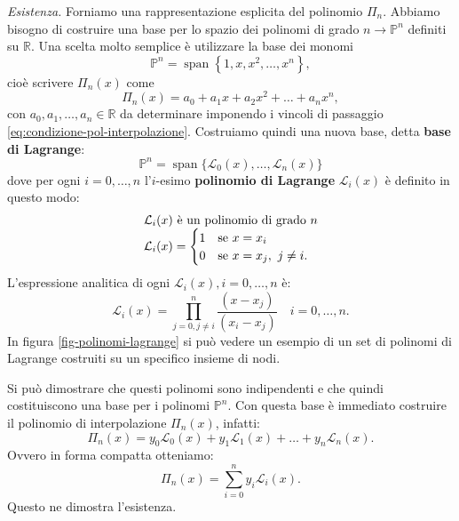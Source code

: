 \textit{Esistenza.} Forniamo una rappresentazione esplicita del polinomio $\Pi _{n}$. Abbiamo bisogno di costruire una base per lo spazio dei polinomi di grado $n\rightarrow \mathbb{P}^{n}$ definiti su $\mathbb{R}$. Una scelta molto semplice è utilizzare la base dei monomi
\begin{equation*}
\mathbb{P}^{n} =\operatorname{span}\left\{1,x,x^{2} ,\dotsc ,x^{n}\right\} ,
\end{equation*}
cioè scrivere $\Pi _{n}(x)$ come
\begin{equation*}
\Pi _{n}(x) =a_{0} +a_{1} x+a_{2} x^{2} +\dotsc +a_{n} x^{n} ,
\end{equation*}
con $a_{0} ,a_{1} ,\dotsc ,a_{n} \in \mathbb{R}$ da determinare imponendo i vincoli di passaggio \eqref{eq:condizione-pol-interpolazione}. Costruiamo quindi una nuova base, detta \textbf{base di Lagrange}:
\begin{equation*}
\mathbb{P}^{n} =\operatorname{span}\{\mathcal{L}_{0}(x) ,\dotsc ,\mathcal{L}_{n}(x)\}
\end{equation*}
dove per ogni $i=0,\dotsc ,n$ l'$i$-esimo \textbf{polinomio di Lagrange} $\mathcal{L}_{i}(x)$ è definito in questo modo:
\begin{equation*}
\begin{array}{{>{\displaystyle}l}}
\mathcal{L}_{i}(x) \ \text{è un polinomio di grado} \ n\\
\mathcal{L}_{i}(x) =\begin{cases}
1 & \text{se} \ x=x_{i}\\
0 & \text{se} \ x=x_{j} ,\ j\neq i.
\end{cases}
\end{array}
\end{equation*}
L'espressione analitica di ogni $\mathcal{L}_{i}(x) ,i=0,\dotsc ,n$ è:
\begin{equation*}
\mathcal{L}_{i}(x) =\prod ^{n}_{j=0,j\neq i}\frac{( x-x_{j})}{( x_{i} -x_{j})} \quad i=0,\dotsc ,n.
\end{equation*}
In figura \ref{fig-polinomi-lagrange} si può vedere un esempio di un set di polinomi di Lagrange costruiti su un specifico insieme di nodi.

Si può dimostrare che questi polinomi sono indipendenti e che quindi costituiscono una base per i polinomi $\mathbb{P}^{n}$. Con questa base è immediato costruire il polinomio di interpolazione $\Pi _{n}(x)$, infatti:
\begin{equation*}
\Pi _{n}(x) =y_{0}\mathcal{L}_{0}(x) +y_{1}\mathcal{L}_{1}(x) +\dotsc +y_{n}\mathcal{L}_{n}(x).
\end{equation*}
Ovvero in forma compatta otteniamo:
\begin{equation*}
\Pi _{n}(x) =\sum ^{n}_{i=0} y_{i}\mathcal{L}_{i}(x) .
\end{equation*}
Questo ne dimostra l'esistenza.

